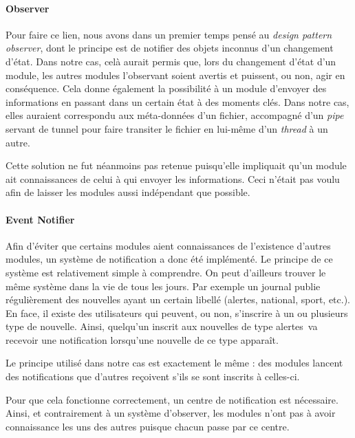\documentclass[a4paper,10pt, twoside]{report}
\begin{document}
\begin{spacing}{1.2}
\paragraph{Observer\\}
Pour faire ce lien, nous avons dans un premier temps pensé au
\textit{design pattern} \textit{observer}, dont le principe est de notifier des
objets inconnus d'un changement d'état. Dans notre cas, celà aurait permis
que, lors du changement d'état d'un module, les autres modules l'observant
soient avertis et puissent, ou non, agir en conséquence. Cela donne
également la possibilité à un module d'envoyer des informations en
passant dans un certain état à des moments clés. Dans notre cas, elles
auraient correspondu aux méta-données d'un fichier, accompagné d'un
\textit{pipe} servant de tunnel pour faire transiter le fichier en lui-même
d'un \textit{thread} à un autre.

Cette solution ne fut néanmoins pas retenue puisqu'elle impliquait qu'un
module ait connaissances de celui à qui envoyer les informations. Ceci
n'était pas voulu afin de laisser les modules aussi indépendant que
possible.

\paragraph{Event Notifier\\}
Afin d'éviter que certains modules aient connaissances de l'existence d'autres
modules, un système de notification a donc été implémenté. Le
principe de ce système est relativement simple à comprendre. On peut
d'ailleurs trouver le même système dans la vie de tous les jours. Par
exemple un journal publie régulièrement des nouvelles ayant un certain
libellé (\flqq alertes\frqq, \flqq national\frqq, \flqq sport\frqq, etc.).
En face, il existe des utilisateurs qui peuvent, ou non, s'inscrire à un ou
plusieurs type de nouvelle. Ainsi, quelqu'un inscrit aux nouvelles de type
\flqq alertes\frqq~va recevoir une notification lorsqu'une nouvelle de ce type
apparaît.

Le principe utilisé dans notre cas est exactement le même : des modules
lancent des notifications que d'autres reçoivent s'ils se sont inscrits à
celles-ci.

Pour que cela fonctionne correctement, un centre de notification est
nécessaire. Ainsi, et contrairement à un système d'\flqq observer\frqq,
les modules n'ont pas à avoir connaissance les uns des autres puisque chacun
passe par ce centre.


\end{spacing}
\end{document}
